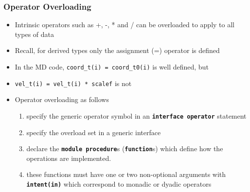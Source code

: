 \documentclass[slidestop,mathserif,compress,xcolor=svgnames]{beamer}
\newcommand{\bftt}[1]{\textbf{\texttt{#1}}}
\newenvironment{eblock}[0]
{
\begin{beamerboxesrounded}[upper=uppercol2,lower=lowercol2,shadow=true]}
{\end{beamerboxesrounded}}
\begin{document}
\begin{frame}
  \frametitle{\small Operator Overloading}
  \begin{itemize}
    \item Intrinsic operators such as +, -, * and / can be overloaded to apply to all types of data
    \item Recall, for derived types only the assignment (=) operator is defined
    \item In the MD code, \texttt{coord\_t(i) = coord\_t0(i)} is well defined, but
    \item \texttt{vel\_t(i) = vel\_t(i) * scalef} is not
    \item Operator overloading as follows
    \begin{enumerate}
      \item specify the generic operator symbol in an \bftt{interface operator} statement
      \item specify the overload set in a generic interface
      \item declare the \bftt{module procedure}s (\bftt{function}s) which define how the operations are implemented.
      \item these functions must have one or two non-optional arguments with \bftt{intent(in)} which correspond to monadic or dyadic operators
    \end{enumerate}
  \end{itemize}
  \framebreak
\end{frame}
\end{document}
